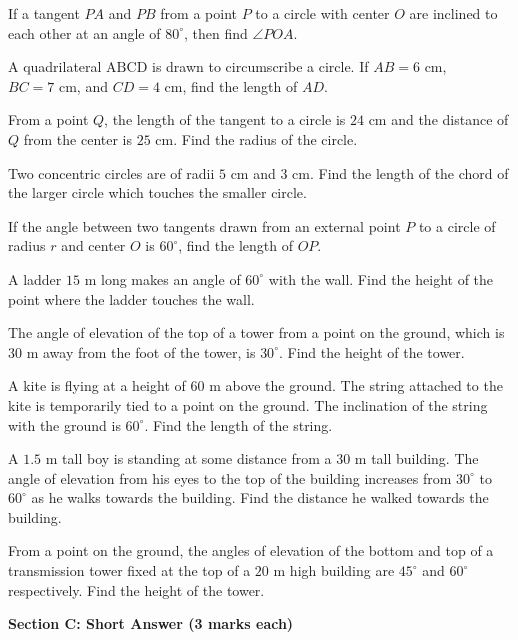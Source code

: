 \documentclass[12pt,a4paper]{exam}
\begin{document}
\begin{questions}
\question[2] If a tangent $PA$ and $PB$ from a point $P$ to a circle with center $O$ are inclined to each other at an angle of $80^{\circ}$, then find $\angle POA$.
\vspace{0.15cm}

\question[2] A quadrilateral $\text{ABCD}$ is drawn to circumscribe a circle. If $AB = 6\text{ cm}$, $BC = 7\text{ cm}$, and $CD = 4\text{ cm}$, find the length of $AD$.
\vspace{0.15cm}

\question[2] From a point $Q$, the length of the tangent to a circle is $24\text{ cm}$ and the distance of $Q$ from the center is $25\text{ cm}$. Find the radius of the circle.
\vspace{0.15cm}

\question[2] Two concentric circles are of radii $5\text{ cm}$ and $3\text{ cm}$. Find the length of the chord of the larger circle which touches the smaller circle.
\vspace{0.15cm}

\question[2] If the angle between two tangents drawn from an external point $P$ to a circle of radius $r$ and center $O$ is $60^{\circ}$, find the length of $OP$.
\vspace{0.15cm}

\question[2] A ladder $15$ m long makes an angle of $60^\circ$ with the wall. Find the height of the point where the ladder touches the wall.
\vspace{0.15cm}

\question[2] The angle of elevation of the top of a tower from a point on the ground, which is $30$ m away from the foot of the tower, is $30^\circ$. Find the height of the tower.
\vspace{0.15cm}

\question[2] A kite is flying at a height of $60$ m above the ground. The string attached to the kite is temporarily tied to a point on the ground. The inclination of the string with the ground is $60^\circ$. Find the length of the string.
\vspace{0.15cm}

\question[2] A $1.5$ m tall boy is standing at some distance from a $30$ m tall building. The angle of elevation from his eyes to the top of the building increases from $30^\circ$ to $60^\circ$ as he walks towards the building. Find the distance he walked towards the building.
\vspace{0.15cm}

\question[2] From a point on the ground, the angles of elevation of the bottom and top of a transmission tower fixed at the top of a $20$ m high building are $45^\circ$ and $60^\circ$ respectively. Find the height of the tower.
\vspace{0.15cm}

\end{questions}
\bigskip
\noindent\textbf{\large Section C: Short Answer (3 marks each)}
\end{document}
